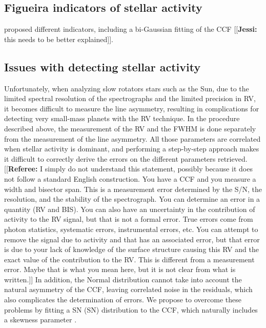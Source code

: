 \documentclass[11pt, oneside]{article}
\newcommand{\jessi}[1]{{\color{Purple}[[\textbf{Jessi: }#1]]}}
\newcommand{\comment}[1]{{\color{red}[[\textbf{Referee: }#1]]}}
\begin{document}
\subsection{Figueira indicators of stellar activity}
\citet{Figueira-2013} proposed different indicators, including a bi-Gaussian fitting of the CCF \jessi{this needs to be better explained}. 


\subsection{Issues with detecting stellar activity}
Unfortunately, when analyzing slow rotators stars such as the Sun, due to the limited spectral resolution of the spectrographs and the limited precision in RV, it becomes difficult to measure the line asymmetry, resulting in complications for detecting very small-mass planets with the RV technique.
In the procedure described above, the measurement of the RV and the FWHM is done separately from the measurement of the line asymmetry. All those parameters are correlated when stellar activity is dominant, and performing a step-by-step approach makes it difficult to correctly derive the errors on the different parameters retrieved. 
\comment{I simply do not understand this statement, possibly because it does not follow a standard English construction. You have a CCF and you measure a width and bisector span. This is a measurement error determined by the S/N, the resolution, and the stability of the spectrograph. You can determine an error in a quantity (RV and BIS). You can also have an uncertainty in the contribution of activity to the RV signal, but that is not a formal error. True errors come from photon statistics, systematic errors, instrumental errors, etc. You can attempt to remove the signal due to activity and that has an associated error, but that error is due to your lack of knowledge of the surface structure causing this RV and the exact value of the contribution to the RV. This is different from a measurement error. Maybe that is what you mean here, but it is not clear from what is written.}
In addition, the Normal distribution cannot take into account the natural asymmetry of the CCF, leaving correlated noise in the residuals, which also complicates the determination of errors. We propose to overcome these problems by fitting a SN (SN) distribution to the CCF, which naturally includes a skewness parameter \citep[][]{Azzalini1985}.


\end{document}

